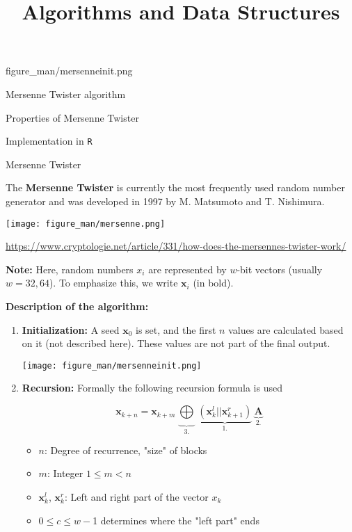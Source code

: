 \documentclass[11pt,compress,t,notes=noshow, xcolor=table]{beamer}
\title{Algorithms and Data Structures}
\begin{document}
{figure_man/mersenneinit.png}
{
  \item Mersenne Twister algorithm
  \item Properties of Mersenne Twister
  \item Implementation in \texttt{R}
}

\begin{vbframe}{Mersenne Twister}

The \textbf{Mersenne Twister} is currently the most frequently used random number generator and was developed in 1997 by M. Matsumoto and T. Nishimura.

\begin{center}
\texttt{[image: figure\_man/mersenne.png]} \\
\begin{footnotesize}
\url{https://www.cryptologie.net/article/331/how-does-the-mersennes-twister-work/}
\end{footnotesize}
\end{center}


\framebreak

\begin{small}
	\textbf{Note:} Here, random numbers $x_i$ are represented by $w$-bit vectors (usually $w = 32, 64$). To emphasize this, we write $\mathbf{x}_i$ (in bold).
\end{small}

\vspace*{0.2cm}

\textbf{Description of the algorithm:}
\begin{enumerate}
\item \textbf{Initialization: } A seed $\mathbf{x}_0$ is set, and the first $n$ values are calculated based on it (not described here). These values are not part of the final output.
\vspace*{0.2cm}
\begin{center}
\texttt{[image: figure\_man/mersenneinit.png]}
\end{center}

\framebreak

\item \textbf{Recursion:} Formally the following recursion formula is used

$$
\mathbf{x}_{k + n} = \mathbf{x}_{k + m}\ \underbrace{\bigoplus}_{3.}\ \underbrace{(\mathbf{x}_{k}^l ||  \mathbf{x}_{k + 1}^r)}_{1.}\ \underbrace{\mathbf{A}}_{2.}
$$

\begin{itemize}
	\item $n$: Degree of recurrence, "size" of blocks
	\item $m$: Integer $1 \le m < n$
	\item $\mathbf{x}_{k}^l$, $\mathbf{x}_{k}^r$: Left and right part of the vector $x_{k}$
	\item $0 \le c \le w - $1 determines where the "left part" ends
\end{itemize}


\end{enumerate}
\end{vbframe}
\end{document}
